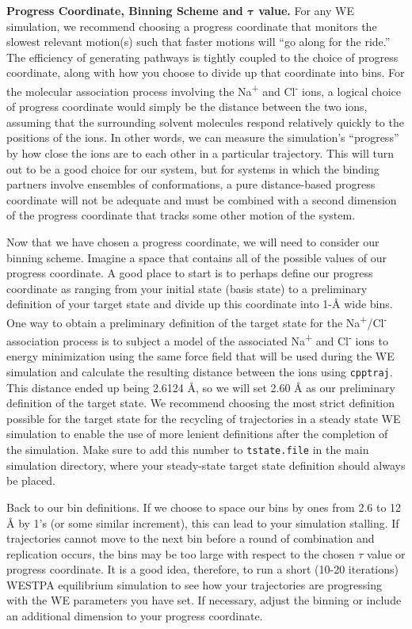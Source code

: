 \documentclass[9pt,tutorial,pubversion]{livecoms}
\begin{document}
\textbf{Progress Coordinate, Binning Scheme and $\pmb{\tau}$ value.}  For any WE simulation, we recommend choosing a progress coordinate that monitors the slowest relevant motion(s) such that faster motions will “go along for the ride.” 
The efficiency of generating pathways is tightly coupled to the choice of progress coordinate, along with how you choose to divide up that coordinate into bins. 
For the molecular association process involving the Na\textsuperscript{+} and Cl\textsuperscript{-} ions, a logical choice of progress coordinate would simply be the distance between the two ions, assuming that the surrounding solvent molecules respond relatively quickly to the positions of the ions. 
In other words, we can measure the simulation’s “progress” by how close the ions are to each other in a particular trajectory. 
This will turn out to be a good choice for our system, but for systems in which the binding partners involve ensembles of conformations, a pure distance-based progress coordinate will not be adequate and must be combined with a second dimension of the progress coordinate that tracks some other motion of the system.

Now that we have chosen a progress coordinate, we will need to consider our binning scheme. 
Imagine a space that contains all of the possible values of our progress coordinate. 
A good place to start is to perhaps define our progress coordinate as ranging from your initial state (basis state) to a preliminary definition of your target state and divide up this coordinate into 1-\AA{} wide bins. 
One way to obtain a preliminary definition of the target state for the Na\textsuperscript{+}/Cl\textsuperscript{-} association process is to subject a model of the associated Na\textsuperscript{+} and Cl\textsuperscript{-} ions to energy minimization using the same force field that will be used during the WE simulation and calculate the resulting distance between the ions using \verb|cpptraj|. 
This distance ended up being 2.6124 \AA{}, so we will set 2.60 \AA{} as our preliminary definition of the target state. 
We recommend choosing the most strict definition possible for the target state for the recycling of trajectories in a steady state WE simulation to enable the use of more lenient definitions after the completion of the simulation. 
Make sure to add this number to \verb|tstate.file| in the main simulation directory, where your steady-state target state definition should always be placed.

Back to our bin definitions. 
If we choose to space our bins by ones from 2.6 to 12 \AA{} by 1’s (or some similar increment), this can lead to your simulation stalling. 
If trajectories cannot move to the next bin before a round of combination and replication occurs, the bins may be too large with respect to the chosen $\tau$ value or progress coordinate. 
It is a good idea, therefore, to run a short (10-20 iterations) WESTPA equilibrium simulation to see how your trajectories are progressing with the WE parameters you have set.
If necessary, adjust the binning or include an additional dimension to your progress coordinate.
\end{document}
